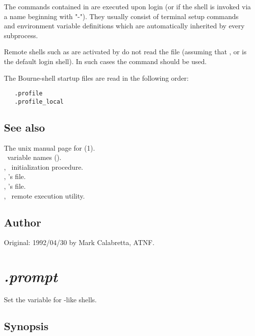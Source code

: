 The commands contained in  are executed upon login (or if the
shell is invoked via a name beginning with "-").  They usually consist of
terminal setup commands and environment variable definitions which are
automatically inherited by every subprocess.

Remote shells such as are activated by  do not read the
 file (assuming that ,  or
 is the default login shell).  In such cases the
 command should be used.

The Bourne-shell startup files are read in the following order:

\begin{verbatim}
   .profile
   .profile_local
\end{verbatim}

\subsection*{See also}

The unix manual page for (1).\\
\aipspp\ variable names ().\\
, \aipspp\ initialization procedure.\\
, 's  file.\\
, 's  file.\\
, \aipspp\ remote execution utility.

\subsection*{Author}

Original: 1992/04/30 by Mark Calabretta, ATNF.


\newpage
\section{\textit{.prompt}}
\label{.prompt}

Set the  variable for -like shells.

\subsection*{Synopsis}

